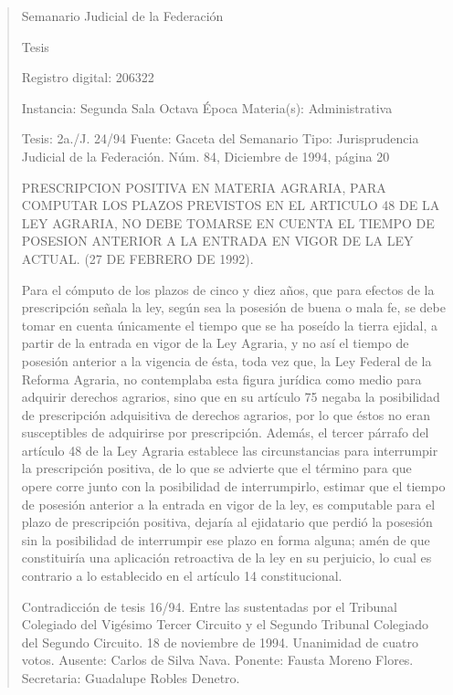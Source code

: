 \documentclass[11pt,a4paper]{article}
\begin{document}
\begin{quote}
                                                   Semanario Judicial de la Federación

                                                  Tesis

 Registro digital: 206322

 Instancia: Segunda Sala           Octava Época                           Materia(s): Administrativa

 Tesis: 2a./J. 24/94               Fuente: Gaceta del Semanario       Tipo: Jurisprudencia
                                   Judicial de la Federación.
                                   Núm. 84, Diciembre de 1994, página
                                   20


PRESCRIPCION POSITIVA EN MATERIA AGRARIA, PARA COMPUTAR LOS PLAZOS
PREVISTOS EN EL ARTICULO 48 DE LA LEY AGRARIA, NO DEBE TOMARSE EN CUENTA EL
TIEMPO DE POSESION ANTERIOR A LA ENTRADA EN VIGOR DE LA LEY ACTUAL. (27 DE
FEBRERO DE 1992).


Para el cómputo de los plazos de cinco y diez años, que para efectos de la prescripción señala la
ley, según sea la posesión de buena o mala fe, se debe tomar en cuenta únicamente el tiempo que
se ha poseído la tierra ejidal, a partir de la entrada en vigor de la Ley Agraria, y no así el tiempo de
posesión anterior a la vigencia de ésta, toda vez que, la Ley Federal de la Reforma Agraria, no
contemplaba esta figura jurídica como medio para adquirir derechos agrarios, sino que en su
artículo 75 negaba la posibilidad de prescripción adquisitiva de derechos agrarios, por lo que éstos
no eran susceptibles de adquirirse por prescripción. Además, el tercer párrafo del artículo 48 de la
Ley Agraria establece las circunstancias para interrumpir la prescripción positiva, de lo que se
advierte que el término para que opere corre junto con la posibilidad de interrumpirlo, estimar que el
tiempo de posesión anterior a la entrada en vigor de la ley, es computable para el plazo de
prescripción positiva, dejaría al ejidatario que perdió la posesión sin la posibilidad de interrumpir ese
plazo en forma alguna; amén de que constituiría una aplicación retroactiva de la ley en su perjuicio,
lo cual es contrario a lo establecido en el artículo 14 constitucional.


Contradicción de tesis 16/94. Entre las sustentadas por el Tribunal Colegiado del Vigésimo Tercer
Circuito y el Segundo Tribunal Colegiado del Segundo Circuito. 18 de noviembre de 1994.
Unanimidad de cuatro votos. Ausente: Carlos de Silva Nava. Ponente: Fausta Moreno Flores.
Secretaria: Guadalupe Robles Denetro.


\end{quote}
\end{document}
